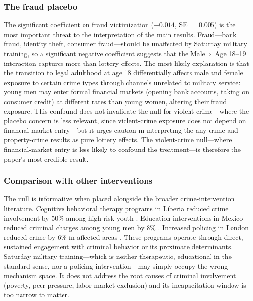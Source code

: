 \documentclass[12pt]{article}
\begin{document}
\subsubsection*{The fraud placebo} The significant coefficient on fraud victimization ($-0.014$, SE $= 0.005$) is the most important threat to the interpretation of the main results. Fraud---bank fraud, identity theft, consumer fraud---should be unaffected by Saturday military training, so a significant negative coefficient suggests that the Male $\times$ Age 18--19 interaction captures more than lottery effects. The most likely explanation is that the transition to legal adulthood at age 18 differentially affects male and female exposure to certain crime types through channels unrelated to military service: young men may enter formal financial markets (opening bank accounts, taking on consumer credit) at different rates than young women, altering their fraud exposure. This confound does not invalidate the null for violent crime---where the placebo concern is less relevant, since violent-crime exposure does not depend on financial market entry---but it urges caution in interpreting the any-crime and property-crime results as pure lottery effects. The violent-crime null---where financial-market entry is less likely to confound the treatment---is therefore the paper's most credible result.

\subsubsection*{Comparison with other interventions} The null is informative when placed alongside the broader crime-intervention literature. Cognitive behavioral therapy programs in Liberia reduced crime involvement by 50\% among high-risk youth \citep{blattman2017reducing}. Education interventions in Mexico reduced criminal charges among young men by 8\% \citep{cano2021dropout, lochner2004effect}. Increased policing in London reduced crime by 6\% in affected areas \citep{draca2011panic}. These programs operate through direct, sustained engagement with criminal behavior or its proximate determinants. Saturday military training---which is neither therapeutic, educational in the standard sense, nor a policing intervention---may simply occupy the wrong mechanism space. It does not address the root causes of criminal involvement (poverty, peer pressure, labor market exclusion) and its incapacitation window is too narrow to matter.
\end{document}
